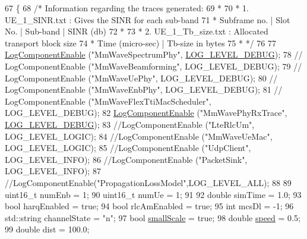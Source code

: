 \begin{DoxyCode}
67 \{
68   \textcolor{comment}{/* Information regarding the traces generated:}
69 \textcolor{comment}{   *}
70 \textcolor{comment}{   * 1. UE\_1\_SINR.txt : Gives the SINR for each sub-band}
71 \textcolor{comment}{   *    Subframe no.  | Slot No. | Sub-band  | SINR (db)}
72 \textcolor{comment}{   *}
73 \textcolor{comment}{   * 2. UE\_1\_Tb\_size.txt : Allocated transport block size}
74 \textcolor{comment}{   *    Time (micro-sec)  |  Tb-size in bytes}
75 \textcolor{comment}{   * */}
76 
77         \hyperlink{namespacens3_adc4ef4f00bb2f5f4edae67fc3bc27f20}{LogComponentEnable} (\textcolor{stringliteral}{"MmWaveSpectrumPhy"}, 
      \hyperlink{namespacens3_aa6464a4d69551a9cc968e17a65f39bdbabc85ae851e992c4d8577705c712061ef}{LOG\_LEVEL\_DEBUG});
78 \textcolor{comment}{//      LogComponentEnable ("MmWaveBeamforming", LOG\_LEVEL\_DEBUG);}
79 \textcolor{comment}{//      LogComponentEnable ("MmWaveUePhy", LOG\_LEVEL\_DEBUG);}
80 \textcolor{comment}{//      LogComponentEnable ("MmWaveEnbPhy", LOG\_LEVEL\_DEBUG);}
81 \textcolor{comment}{//      LogComponentEnable ("MmWaveFlexTtiMacScheduler", LOG\_LEVEL\_DEBUG);}
82         \hyperlink{namespacens3_adc4ef4f00bb2f5f4edae67fc3bc27f20}{LogComponentEnable} (\textcolor{stringliteral}{"MmWavePhyRxTrace"}, 
      \hyperlink{namespacens3_aa6464a4d69551a9cc968e17a65f39bdbabc85ae851e992c4d8577705c712061ef}{LOG\_LEVEL\_DEBUG});
83         \textcolor{comment}{//LogComponentEnable ("LteRlcUm", LOG\_LEVEL\_LOGIC);}
84         \textcolor{comment}{//LogComponentEnable ("MmWaveUeMac", LOG\_LEVEL\_LOGIC);}
85         \textcolor{comment}{//LogComponentEnable ("UdpClient", LOG\_LEVEL\_INFO);}
86         \textcolor{comment}{//LogComponentEnable ("PacketSink", LOG\_LEVEL\_INFO);}
87         \textcolor{comment}{//LogComponentEnable("PropagationLossModel",LOG\_LEVEL\_ALL);}
88 
89         uint16\_t numEnb = 1;
90         uint16\_t numUe = 1;
91 
92         \textcolor{keywordtype}{double} simTime = 1.0;
93         \textcolor{keywordtype}{bool} harqEnabled = \textcolor{keyword}{true};
94         \textcolor{keywordtype}{bool} rlcAmEnabled = \textcolor{keyword}{true};
95         \textcolor{keywordtype}{int} mcsDl = -1;
96         std::string channelState = \textcolor{stringliteral}{"n"};
97         \textcolor{keywordtype}{bool} \hyperlink{mmwave-amc-test_8cc_a204169f2af2a5f81da1189ea236307c8}{smallScale} = \textcolor{keyword}{true};
98         \textcolor{keywordtype}{double} \hyperlink{mmwave-amc-test_8cc_a6dc6e6f3c75c509ce943163afb5dade7}{speed} = 0.5;
99         \textcolor{keywordtype}{double} dist = 100.0;

\end{DoxyCode}
